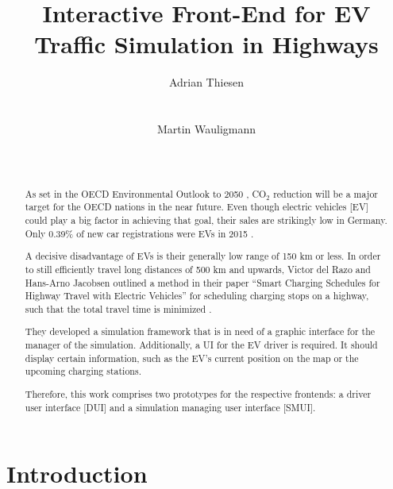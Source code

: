 \documentclass[hidelinks]{sig-alternate}
\begin{document}
\title{Interactive Front-End for EV Traffic Simulation in Highways}



\author{
\alignauthor Adrian Thiesen\\
       \\
       \\
\alignauthor Martin Wauligmann\\
       \\
       \\
}


\maketitle


\begin{abstract}

As set in the OECD Environmental Outlook to 2050 \cite{1}, CO$_2$ reduction will be a major target for the OECD
nations in the near future. Even though electric vehicles [EV] could play a big factor in achieving that goal, their
sales are strikingly low in Germany. Only 0.39\% of new car registrations were EVs in 2015 \cite{2}.

A decisive disadvantage of EVs is their generally low range of 150 km or less. In order to still efficiently travel
long distances of 500 km and upwards, Victor del Razo and Hans-Arno Jacobsen outlined a method in their paper ``Smart
Charging Schedules for Highway Travel with Electric Vehicles'' for scheduling charging stops on a highway, such that
the total travel time is minimized \cite{3}.

They developed a simulation framework that is in need of a graphic interface for the manager of the simulation.
Additionally, a UI for the EV driver is required. It should display certain information, such as the EV's current
position on the map or the upcoming charging stations.

Therefore, this work comprises two prototypes for the respective frontends: a driver user interface [DUI] and a
simulation managing user interface [SMUI].

\end{abstract}


\section{Introduction}
\end{document}
